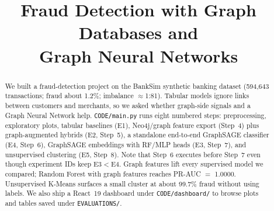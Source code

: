 \documentclass[conference]{IEEEtran}
\begin{document}
\title{Fraud Detection with Graph Databases and\\Graph Neural Networks}

\author{
\and
{}
\and
{}
\and
{}
\and
{}
\and
{}
}

\maketitle

\begin{abstract}
We built a fraud-detection project on the BankSim synthetic banking dataset (594,643 transactions; fraud about 1.2\%; imbalance $\approx$1:81). Tabular models ignore links between customers and merchants, so we asked whether graph-side signals and a Graph Neural Network help. \texttt{CODE/main.py} runs eight numbered steps: preprocessing, exploratory plots, tabular baselines (E1), Neo4j/graph feature export (Step~4) plus graph-augmented hybrids (E2, Step~5), a standalone end-to-end GraphSAGE classifier (E4, Step~6), GraphSAGE embeddings with RF/MLP heads (E3, Step~7), and unsupervised clustering (E5, Step~8). Note that Step~6 executes before Step~7 even though experiment IDs keep E3$<$E4. Graph features lift every supervised model we compared; Random Forest with graph features reaches PR-AUC $=$ 1.0000. Unsupervised K-Means surfaces a small cluster at about 99.7\% fraud without using labels. We also ship a React~19 dashboard under \texttt{CODE/dashboard/} to browse plots and tables saved under \texttt{EVALUATIONS/}.
\end{abstract}
\end{document}
